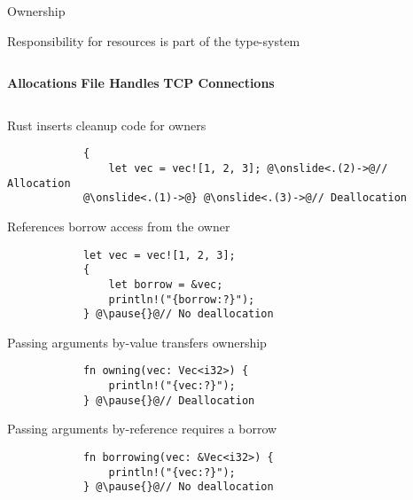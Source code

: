 \begin{multiframe}[fragile]{Ownership}%
	\centering

	\begin{subframe}
		Responsibility for \alert{resources} is part of the \alert{type-system}\\[1em]%
		\pause%

		\begin{columns}%
			\centering\textbf{Allocations}%
			\centering\textbf{File Handles}%
			\centering\textbf{TCP Connections}%
		\end{columns}%
		\vspace{3em}%
		\pause%

		Rust inserts \alert{cleanup code} for owners\\%
		\pause%
		\begin{verbatim}
            {
                let vec = vec![1, 2, 3]; @\onslide<.(2)->@// Allocation
            @\onslide<.(1)->@} @\onslide<.(3)->@// Deallocation
        \end{verbatim}
		\addtocounter{beamerpauses}{2}
	\end{subframe}

	\begin{subframe}
		References \alert{borrow} access from the owner\\%
		\pause%

		\begin{verbatim}
            let vec = vec![1, 2, 3];
            {
                let borrow = &vec;
                println!("{borrow:?}");
            } @\pause{}@// No deallocation
        \end{verbatim}
	\end{subframe}

	\begin{subframe}
		Passing arguments \alert{by-value} transfers ownership\\%
		\pause%

		\begin{verbatim}
            fn owning(vec: Vec<i32>) {
                println!("{vec:?}");
            } @\pause{}@// Deallocation
        \end{verbatim}
		\vspace{2em}%
		\pause%

		Passing arguments \alert{by-reference} requires a borrow\\%
		\pause%

		\begin{verbatim}
            fn borrowing(vec: &Vec<i32>) {
                println!("{vec:?}");
            } @\pause{}@// No deallocation
        \end{verbatim}
	\end{subframe}


\end{multiframe}
